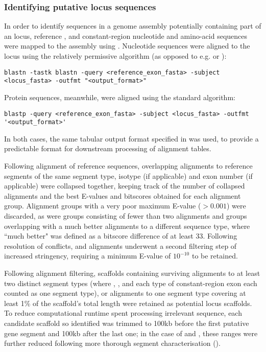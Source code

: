\subsubsection{Identifying putative locus sequences}
\label{sec:methods_comp_locus_scaffolds}

In order to identify sequences in a genome assembly potentially containing part of an \igh{} locus, reference \vh, \jh and constant-region nucleotide and amino-acid sequences were mapped to the assembly using  \parencite{altschul1990blast,altschul1997blast}. Nucleotide sequences were aligned to the locus using the relatively permissive  algorithm (as opposed to e.g.  or ):

\begin{lstlisting}
blastn -tastk blastn -query <reference_exon_fasta> -subject <locus_fasta> -outfmt "<output_format>"
\end{lstlisting}

Protein sequences, meanwhile, were aligned using the standard  algorithm:

\begin{lstlisting}
blastp -query <reference_exon_fasta> -subject <locus_fasta> -outfmt '<output_format>'
\end{lstlisting}

In both cases, the same tabular output format specified in  was used, to provide a predictable format for downstream processing of  alignment tables.

Following alignment of reference sequences, overlapping alignments to reference segments of the same segment type, isotype (if applicable) and exon number (if applicable) were collapsed together, keeping track of the number of collapsed alignments and the best E-values and bitscores obtained for each alignment group. Alignment groups with a very poor maximum E-value ($> 0.001$) were discarded, as were groups consisting of fewer than two alignments and groups overlapping with a much better alignments to a different sequence type, where ``much better" was defined as a bitscore difference of at least 33. Following resolution of conflicts, \vh and \ch alignments underwent a second filtering step of increased stringency, requiring a minimum E-value of $10^{-10}$ to be retained. 

Following alignment filtering, scaffolds containing surviving alignments to at least two distinct segment types (where \vh, \jh, and each type of constant-region exon each counted as one segment type), or alignments to one segment type covering at least 1\% of the scaffold's total length were retained as potential locus scaffolds. To reduce computational runtime spent processing irrelevant sequence, each candidate scaffold so identified was trimmed to 100kb before the first putative gene segment and 100kb after the last one; in the case of \nfu and \xma, these ranges were further reduced following more thorough segment characterisation ().

